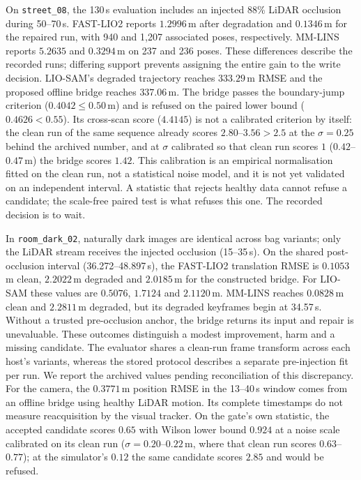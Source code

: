 \documentclass[journal]{IEEEtran}
\begin{document}
On \texttt{street\_08}, the 130\,s evaluation includes an injected 88\% LiDAR occlusion during 50--70\,s. FAST-LIO2 reports $1.2996$\,m after degradation and $0.1346$\,m for the repaired run, with 940 and 1,207 associated poses, respectively. MM-LINS reports $5.2635$ and $0.3294$\,m on 237 and 236 poses. These differences describe the recorded runs; differing support prevents assigning the entire gain to the write decision. LIO-SAM's degraded trajectory reaches $333.29$\,m RMSE and the proposed offline bridge reaches $337.06$\,m. The bridge passes the boundary-jump criterion ($0.4042\leq0.50$\,m) and is refused on the paired lower bound ($0.4626<0.55$). Its cross-scan score ($4.4145$) is not a calibrated criterion by itself: the clean run of the same sequence already scores $2.80$--$3.56>2.5$ at the $\sigma=0.25$ behind the archived number, and at $\sigma$ calibrated so that clean run scores $1$ ($0.42$--$0.47$\,m) the bridge scores $1.42$. This calibration is an empirical normalisation fitted on the clean run, not a statistical noise model, and it is not yet validated on an independent interval. A statistic that rejects healthy data cannot refuse a candidate; the scale-free paired test is what refuses this one. The recorded decision is to wait.

In \texttt{room\_dark\_02}, naturally dark images are identical across bag variants; only the LiDAR stream receives the injected occlusion (15--35\,s). On the shared post-occlusion interval (36.272--48.897\,s), the FAST-LIO2 translation RMSE is $0.1053$\,m clean, $2.2022$\,m degraded and $2.0185$\,m for the constructed bridge. For LIO-SAM these values are $0.5076$, $1.7124$ and $2.1120$\,m. MM-LINS reaches $0.0828$\,m clean and $2.2811$\,m degraded, but its degraded keyframes begin at 34.57\,s. Without a trusted pre-occlusion anchor, the bridge returns its input and repair is unevaluable. These outcomes distinguish a modest improvement, harm and a missing candidate. The evaluator shares a clean-run frame transform across each host's variants, whereas the stored protocol describes a separate pre-injection fit per run. We report the archived values pending reconciliation of this discrepancy. For the camera, the $0.3771$\,m position RMSE in the 13--40\,s window comes from an offline bridge using healthy LiDAR motion. Its complete timestamps do not measure reacquisition by the visual tracker. On the gate's own statistic, the accepted candidate scores $0.65$ with Wilson lower bound $0.924$ at a noise scale calibrated on its clean run ($\sigma=0.20$--$0.22$\,m, where that clean run scores $0.63$--$0.77$); at the simulator's $0.12$ the same candidate scores $2.85$ and would be refused.
\end{document}
